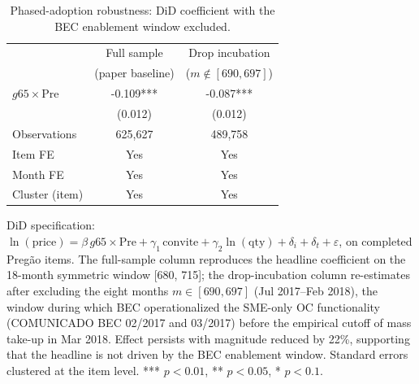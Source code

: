 \begin{table}[!htbp]
\centering
\begin{threeparttable}
\caption{Phased-adoption robustness: DiD coefficient with the BEC enablement window excluded.}
\label{tab:phased_adoption}
\small
\setlength{\tabcolsep}{8pt}
\begin{tabular}{lcc}
\toprule
 & Full sample & Drop incubation \\
 & (paper baseline) & ($m \notin [690, 697]$) \\
\midrule
$g65 \times \text{Pre}$ & -0.109*** & -0.087*** \\
 & (0.012) & (0.012) \\
\addlinespace
Observations & 625,627 & 489,758 \\
Item FE & Yes & Yes \\
Month FE & Yes & Yes \\
Cluster (item) & Yes & Yes \\
\bottomrule
\end{tabular}
\begin{tablenotes}\footnotesize
\item DiD specification: $\ln(\text{price}) = \beta\, g65 \times \text{Pre} + \gamma_1 \,\text{convite} + \gamma_2 \ln(\text{qty}) + \delta_i + \delta_t + \varepsilon$, on completed Preg\~ao items. The full-sample column reproduces the headline coefficient on the 18-month symmetric window [680, 715]; the drop-incubation column re-estimates after excluding the eight months $m \in [690, 697]$ (Jul 2017--Feb 2018), the window during which BEC operationalized the SME-only OC functionality (COMUNICADO BEC 02/2017 and 03/2017) before the empirical cutoff of mass take-up in Mar 2018. Effect persists with magnitude reduced by 22\%, supporting that the headline is not driven by the BEC enablement window. Standard errors clustered at the item level. *** $p<0.01$, ** $p<0.05$, * $p<0.1$.
\end{tablenotes}
\end{threeparttable}
\end{table}

